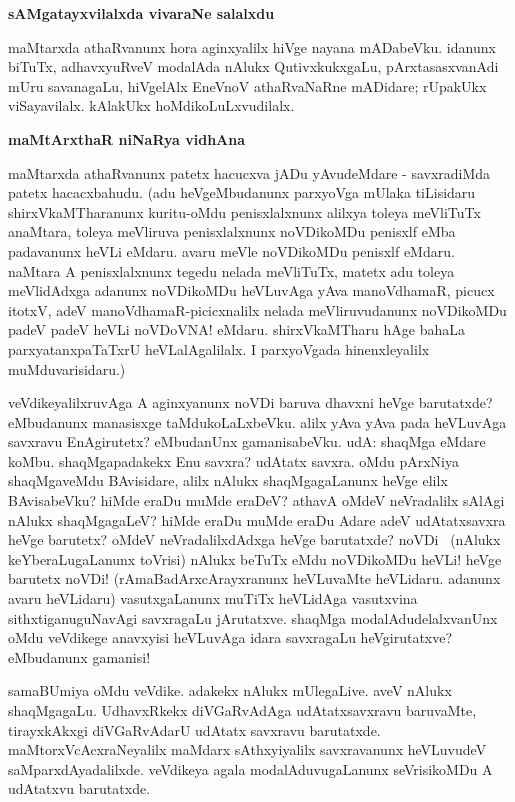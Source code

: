 {\bigskip
\noindent
{\large\bf sAMgatayxvilalxda vivaraNe salalxdu}}\label{page118}
\medskip

\noindent
maMtarxda athaRvanunx hora aginxyalilx hiVge nayana mADabeVku. idanunx biTuTx, adhavxyuRveV modalAda nAlukx QutivxkukxgaLu, pArxtasasxvanAdi mUru savanagaLu, hiVgelAlx EneVnoV athaRvaNaRne mADidare; rUpakUkx viSayavilalx. kAlakUkx hoMdikoLuLxvudilalx.

{\bigskip
\noindent
{\large\bf maMtArxthaR niNaRya vidhAna}}\label{page118a}
\medskip

\noindent
maMtarxda athaRvanunx patetx hacucxva jADu yAvudeMdare - savxradiMda patetx hacacxbahudu. (adu heVgeMbudanunx parxyoVga mUlaka tiLisidaru shirxVkaMTharanunx kuritu-oMdu penisxlalxnunx alilxya toleya meVliTuTx anaMtara, toleya meVliruva penisxlalxnunx noVDikoMDu penisxlf eMba padavanunx heVLi eMdaru. avaru meVle noVDikoMDu penisxlf eMdaru. naMtara A penisxlalxnunx tegedu nelada meVliTuTx, matetx adu toleya meVlidAdxga adanunx noVDikoMDu heVLuvAga yAva manoVdhamaR, picucx itotxV, adeV manoVdhamaR-picicxnalilx nelada meVliruvudanunx noVDikoMDu padeV padeV heVLi noVDoVNA! eMdaru. shirxVkaMTharu hAge bahaLa parxyatanxpaTaTxrU heVLalAgalilalx. I parxyoVgada hinenxleyalilx muMduvarisidaru.)

veVdikeyalilxruvAga A aginxyanunx noVDi baruva dhavxni heVge barutatxde? 
eMbudanunx manasisxge taMdukoLaLxbeVku. alilx yAva yAva pada heVLuvAga 
savxravu EnAgirutetx? eMbudanUnx gamanisabeVku. udA: shaqMga eMdare 
koMbu. shaqMgapadakekx Enu savxra? udAtatx savxra. oMdu pArxNiya 
shaqMgaveMdu BAvisidare, alilx nAlukx shaqMgagaLanunx heVge elilx 
BAvisabeVku? hiMde eraDu muMde eraDeV? athavA oMdeV neVradalilx sAlAgi nAlukx shaqMgagaLeV? hiMde eraDu muMde eraDu Adare adeV udAtatxsavxra heVge barutetx? 
oMdeV neVradalilxdAdxga heVge barutatxde? noVDi~ (nAlukx keYberaLugaLanunx toVrisi) nAlukx beTuTx eMdu noVDikoMDu heVLi! heVge barutetx noVDi! (rAmaBadArxcArayxranunx heVLuvaMte heVLidaru. adanunx avaru heVLidaru) vasutxgaLanunx muTiTx heVLidAga vasutxvina sithxtiganuguNavAgi savxragaLu jArutatxve. shaqMga modalAdudelalxvanUnx oMdu veVdikege anavxyisi heVLuvAga idara savxragaLu heVgirutatxve? eMbudanunx gamanisi!

samaBUmiya oMdu veVdike. adakekx nAlukx mUlegaLive. aveV nAlukx 
shaqMgagaLu. UdhavxRkekx diVGaRvAdAga udAtatxsavxravu baruvaMte, 
tirayxkAkxgi diVGaRvAdarU udAtatx savxravu barutatxde. 
maMtorxVcAcxraNeyalilx maMdarx sAthxyiyalilx savxravanunx heVLuvudeV 
saMparxdAyadalilxde. veVdikeya agala modalAduvugaLanunx seVrisikoMDu A udAtatxvu barutatxde.

